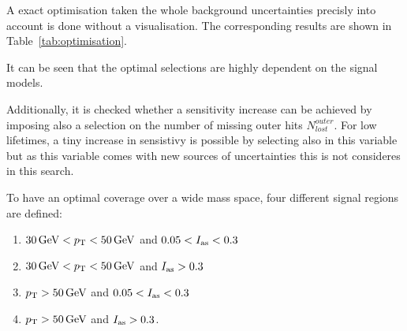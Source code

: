A exact optimisation taken the whole background uncertainties precisly into account is done without a visualisation.
The corresponding results are shown in Table~\ref{tab:optimisation}.

\renewcommand{\arraystretch}{1.5}
\begin{table}[!h]
\centering
\caption{Optimal \pt and \ias cuts and corresponding minimal possible cross section $\sigma_{\text{min}}$ to exclude for different signal models.}
\label{tab:optimisation}
\end{table}

It can be seen that the optimal selections are highly dependent on the signal models.

Additionally, it is checked whether a sensitivity increase can be achieved by imposing also a selection on the number of missing outer hits $N_{lost}^{outer}$.
For low lifetimes, a tiny increase in sensistivy is possible by selecting also in this variable but as this variable comes with new sources of uncertainties this is not consideres in this search.

To have an optimal coverage over a wide mass space, four different signal regions are defined:
\begin{enumerate}
\item $30\,\text{Ge}\kern-0.06667em\text{V}<p_{\text{T}}<50\,\text{Ge}\kern-0.06667em\text{V}$ and $0.05<I_{\text{as}}<0.3$
\item $30\,\text{Ge}\kern-0.06667em\text{V}<p_{\text{T}}<50\,\text{Ge}\kern-0.06667em\text{V}$ and $I_{\text{as}}>0.3$
\item $p_{\text{T}}>50\,\text{Ge}\kern-0.06667em\text{V}$ and $0.05<I_{\text{as}}<0.3$
\item $p_{\text{T}}>50\,\text{Ge}\kern-0.06667em\text{V}$ and $I_{\text{as}}>0.3$.
\end{enumerate}

